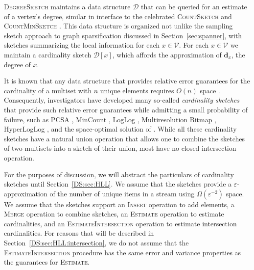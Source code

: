 \documentclass[10]{article}
\newcommand{\algoname}[1]{\textnormal{\textsc{#1}}}
\begin{document}
\algoname{DegreeSketch} maintains a data structure $\mathcal{D}$ that can be queried for an estimate of a vertex's degree, similar in interface to the celebrated \algoname{CountSketch} \cite{charikar2002finding} and \algoname{CountMinSketch} \cite{cormode2005improved}.
This data structure is organized not unlike the sampling sketch approach to graph sparsification discussed in Section~\ref{sec:spanner}, with sketches summarizing the local information for each $x \in \mathcal{V}$.
For each $x \in \mathcal{V}$ we maintain a cardinality sketch $\mathcal{D}[x]$, which affords the approximation of $\mathbf{d}_x$, the degree of $x$. 

It is known that any data structure that provides relative error guarantees for the cardinality of a multiset with $n$ unique elements requires $O(n)$ space \cite{alon1999space}.
Consequently, investigators have developed many so-called \emph{cardinality sketches} that provide such relative error guarantees while admitting a small probability of failure, such as PCSA \cite{flajolet1985probabilistic}, MinCount \cite{bar2002counting},  LogLog \cite{durand2003loglog}, Multiresolution Bitmap \cite{estan2003bitmap}, HyperLogLog \cite{flajolet2007hyperloglog}, and the space-optimal solution of \cite{kane2010optimal}.
While all these cardinality sketches have a natural union operation that allows one to combine the sketches of two multisets into a sketch of their union, most have no closed intersection operation.

For the purposes of discussion, we will abstract the particulars of cardinality sketches until Section~\ref{DS:sec:HLL}.
We assume that the sketches provide a $\varepsilon$-approximation of the number of unique items in a stream using $\Omega(\varepsilon^{-2})$ space.
We assume that the sketches support an \algoname{Insert} operation to add elements, a \algoname{Merge} operation to combine sketches, an \algoname{Estimate} operation to estimate cardinalities, and an \algoname{EstimateIntersection} operation to estimate intersection cardinalities.
For reasons that will be described in Section~\ref{DS:sec:HLL:intersection}, we do not assume that the \algoname{EstimateIntersection} procedure has the same error and variance properties as the guarantees for \algoname{Estimate}.
\end{document}
